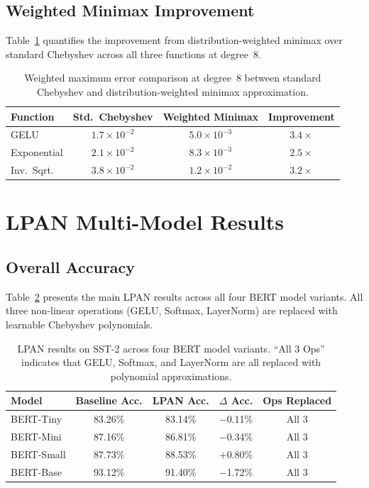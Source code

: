 \subsection{Weighted Minimax Improvement}

Table~\ref{tab:weighted_improvement} quantifies the improvement from distribution-weighted minimax over standard Chebyshev across all three functions at degree~8.

\begin{table}[ht]
\centering
\caption{Weighted maximum error comparison at degree~8 between standard Chebyshev and distribution-weighted minimax approximation.}
\label{tab:weighted_improvement}
\begin{tabular}{lccc}
\toprule
\textbf{Function} & \textbf{Std.\ Chebyshev} & \textbf{Weighted Minimax} & \textbf{Improvement} \\
\midrule
GELU            & $1.7 \times 10^{-2}$ & $5.0 \times 10^{-3}$ & $3.4\times$ \\
Exponential     & $2.1 \times 10^{-2}$ & $8.3 \times 10^{-3}$ & $2.5\times$ \\
Inv.\ Sqrt.     & $3.8 \times 10^{-2}$ & $1.2 \times 10^{-2}$ & $3.2\times$ \\
\bottomrule
\end{tabular}
\end{table}


\section{LPAN Multi-Model Results}
\label{sec:lpan_results}

\subsection{Overall Accuracy}

Table~\ref{tab:lpan_results} presents the main LPAN results across all four BERT model variants. All three non-linear operations (GELU, Softmax, LayerNorm) are replaced with learnable Chebyshev polynomials.

\begin{table}[ht]
\centering
\caption{LPAN results on SST-2 across four BERT model variants. ``All 3 Ops'' indicates that GELU, Softmax, and LayerNorm are all replaced with polynomial approximations.}
\label{tab:lpan_results}
\begin{tabular}{lcccc}
\toprule
\textbf{Model} & \textbf{Baseline Acc.} & \textbf{LPAN Acc.} & \textbf{$\Delta$ Acc.} & \textbf{Ops Replaced} \\
\midrule
BERT-Tiny  & 83.26\% & 83.14\% & $-$0.11\% & All 3 \\
BERT-Mini  & 87.16\% & 86.81\% & $-$0.34\% & All 3 \\
BERT-Small & 87.73\% & 88.53\% & $+$0.80\% & All 3 \\
BERT-Base  & 93.12\% & 91.40\% & $-$1.72\% & All 3 \\
\bottomrule
\end{tabular}
\end{table}

